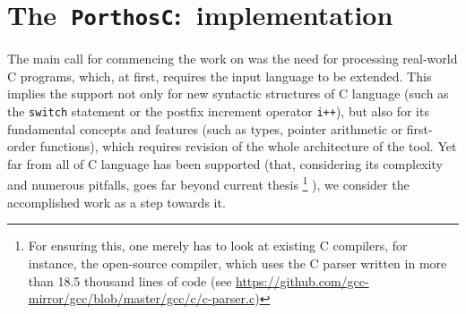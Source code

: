 \chapter{The~\texttt{PorthosC}:~implementation}
\label{ch:impl}

The main call for commencing the work on \porthos[2] was the need for processing real-world C programs, which, at first, requires the input language to be extended.
This implies the support not only for new syntactic structures of C language (such as the \texttt{switch} statement or the postfix increment operator \texttt{i++}), but also for its fundamental concepts and features (such as types, pointer arithmetic or first-order functions), which requires revision of the whole architecture of the tool.
Yet far from all of C language has been supported (that, considering its complexity and numerous pitfalls, goes far beyond current thesis%
%
\footnote{For ensuring this, one merely has to look at existing C compilers, for instance, the open-source  compiler, which uses the C parser written in more than 18.5 thousand lines of code (see \url{https://github.com/gcc-mirror/gcc/blob/master/gcc/c/c-parser.c})}%
%
), we consider the accomplished work as a step towards it.






